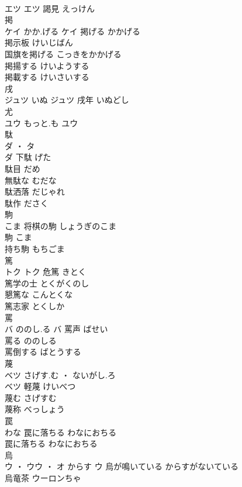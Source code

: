 \documentclass[8pt]{extreport}
\begin{document}
\begin{CJK}{UTF8}{min}
\\	エツ		エツ													謁見	えっけん	
\\	掲	
\\	ケイ	かか.げる	ケイ	掲げる	かかげる	
\\	掲示板	けいじばん	
\\	国旗を掲げる	こっきをかかげる	
\\	掲揚する	けいようする	
\\	掲載する	けいさいする	
\\	戌	
\\	ジュツ	いぬ	ジュツ	戌年	いぬどし	
\\	尤	
\\	ユウ	もっと.も	ユウ																																			
\\	駄	
\\	ダ ・ タ
\\	ダ	下駄	げた	
\\	駄目	だめ	
\\	無駄な	むだな	
\\	駄洒落	だじゃれ	
\\	駄作	ださく	
\\	駒	
\\	こま		将棋の駒	しょうぎのこま	
\\	駒	こま	
\\	持ち駒	もちごま	
\\	篤	
\\	トク		トク	危篤	きとく	
\\	篤学の士	とくがくのし	
\\	懇篤な	こんとくな	
\\	篤志家	とくしか	
\\	罵	
\\	バ	ののし.る	バ	罵声	ばせい	
\\	罵る	ののしる	
\\	罵倒する	ばとうする	
\\	蔑	
\\	ベツ	さげす.む ・ ないがし.ろ
\\	ベツ	軽蔑	けいべつ	
\\	蔑む	さげすむ	
\\	蔑称	べっしょう	
\\	罠	
\\	わな		罠に落ちる	わなにおちる	
\\	罠に落ちる	わなにおちる	
\\	烏	
\\	ウ ・ ウウ ・ オ	からす	ウ	烏が鳴いている	からすがないている	
\\	烏竜茶	ウーロンちゃ	

\end{CJK}
\end{document}
